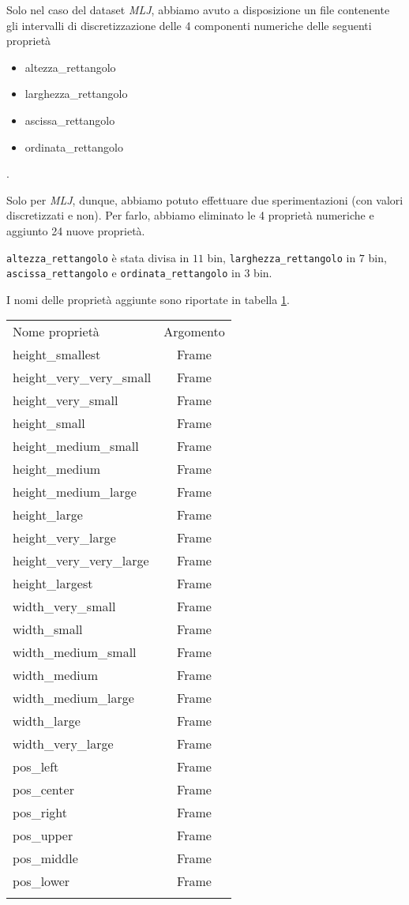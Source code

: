Solo nel caso del dataset \emph{MLJ}, abbiamo avuto a disposizione un file contenente gli intervalli di discretizzazione delle 4 componenti numeriche delle seguenti proprietà
\begin{itemize}
\item altezza\_rettangolo
\item larghezza\_rettangolo
\item ascissa\_rettangolo
\item ordinata\_rettangolo
\end{itemize}
.

Solo per \emph{MLJ}, dunque, abbiamo potuto effettuare due sperimentazioni (con valori discretizzati e non). Per farlo, abbiamo eliminato le 4 proprietà numeriche e aggiunto 24 nuove proprietà.

\verb+altezza_rettangolo+ è stata divisa in $11$ bin, \verb+larghezza_rettangolo+ in $7$ bin, \verb+ascissa_rettangolo+ e \verb+ordinata_rettangolo+ in $3$ bin.

I nomi delle proprietà aggiunte sono riportate in tabella \ref{tab:discretizzazione}.

\begin{table}[htbp]
\centering
\label{tab:discretizzazione}
\small\begin{tabular}{lc}
\toprule
\addlinespace
Nome proprietà & Argomento \\
\addlinespace
\midrule
\addlinespace
height\_smallest & Frame \\ 
height\_very\_very\_small & Frame \\ 
height\_very\_small & Frame \\ 
height\_small & Frame \\ 
height\_medium\_small & Frame \\ 
height\_medium & Frame \\ 
height\_medium\_large & Frame \\ 
height\_large & Frame \\ 
height\_very\_large & Frame \\ 
height\_very\_very\_large & Frame \\ 
height\_largest & Frame \\ 
\midrule
width\_very\_small & Frame \\ 
width\_small & Frame \\ 
width\_medium\_small & Frame \\ 
width\_medium & Frame \\ 
width\_medium\_large & Frame \\ 
width\_large & Frame \\ 
width\_very\_large & Frame \\ 
\midrule
pos\_left & Frame \\ 
pos\_center & Frame \\ 
pos\_right & Frame \\
\midrule
pos\_upper & Frame \\ 
pos\_middle & Frame \\ 
pos\_lower & Frame \\  
\addlinespace
\bottomrule 
\end{tabular}
\end{table}


